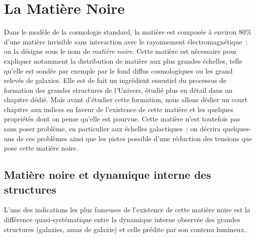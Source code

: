 \chapter{La Matière Noire}

Dans le modèle de la cosmologie standard, la matière est composée à environ $80\%$ d'une matière invisible sans interaction avec le rayonnement électromagnétique~: on la désigne sous le nom de \textit{matière noire}. Cette matière est nécessaire pour expliquer notamment la distribution de matière aux plus grandes échelles, telle qu'elle est sondée par exemple par le fond diffus cosmologiques ou les grand relevés de galaxies. Elle est de fait un ingrédient essentiel du processus de formation des grandes structures de l'Univers, étudié plus en détail dans un chapitre dédié. Mais avant d'étudier cette formation, nous allons dédier un court chapitre aux indices en faveur de l'existence de cette matière et les quelques propriétés dont on pense qu'elle est pourvue. Cette matière n'est toutefois pas sans poser problème, en particulier aux échelles galactiques~: on décrira quelques-uns de ces problèmes ainsi que les pistes possible d'une réduction des tensions que pose cette matière noire.

\section{Matière noire et dynamique interne des structures}
L'une des indications les plus fameuses de l'existence de cette matière noire est la différence quasi-systématique entre la dynamique interne observée des grandes structures (galaxies, amas de galaxie) et celle prédite par son contenu lumineux.

